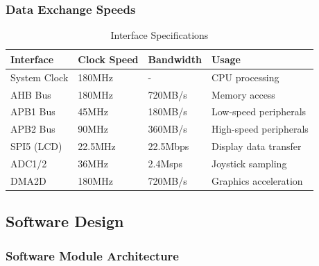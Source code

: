 \documentclass[12pt,a4paper]{article}
\begin{document}
\subsubsection{Data Exchange Speeds}

\begin{table}[H]
\centering
\caption{Interface Specifications}
\label{tab:interface_speeds}
\begin{tabular}{|l|l|l|l|}
\hline
\textbf{Interface} & \textbf{Clock Speed} & \textbf{Bandwidth} & \textbf{Usage} \\
\hline
System Clock & 180MHz & - & CPU processing \\
\hline
AHB Bus & 180MHz & 720MB/s & Memory access \\
\hline
APB1 Bus & 45MHz & 180MB/s & Low-speed peripherals \\
\hline
APB2 Bus & 90MHz & 360MB/s & High-speed peripherals \\
\hline
SPI5 (LCD) & 22.5MHz & 22.5Mbps & Display data transfer \\
\hline
ADC1/2 & 36MHz & 2.4Msps & Joystick sampling \\
\hline
DMA2D & 180MHz & 720MB/s & Graphics acceleration \\
\hline
\end{tabular}
\end{table}

\subsection{Software Design}

\subsubsection{Software Module Architecture}
\end{document}
